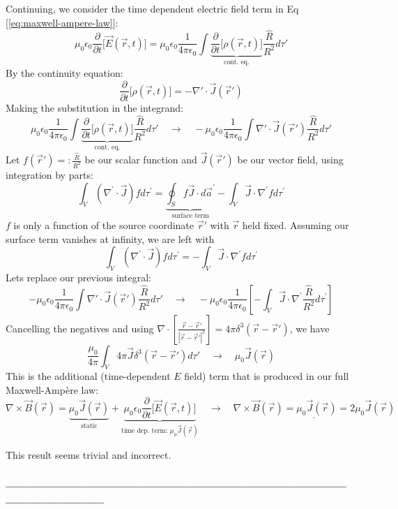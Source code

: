 \documentclass[a4paper,12pt]{article} %
\begin{document}
Continuing, we consider the time dependent electric field term in Eq [\ref{eq:maxwell-ampere-law}]:
$$  \mu_0\epsilon_0 \frac{\partial}{\partial t} \Big[\vec{E}(\vec{r}, t)\Big] = \mu_0\epsilon_0 \frac{1}{4\pi\epsilon_0}\int \underbrace{\frac{\partial}{\partial t}\Big[\rho(\vec{r}, t)\Big]}_{\text{cont. eq.}} \frac{\hat{R}}{{R^2}} d\tau' $$
By the continuity equation:
$$ \frac{\partial}{\partial t}\Big[\rho(\vec{r}, t)\Big] = -\nabla' \cdot \vec{J}(\overrightarrow{r}') $$
Making the substitution in the integrand:
$$ \mu_0\epsilon_0 \frac{1}{4\pi\epsilon_0}\int \underbrace{\frac{\partial}{\partial t}\Big[\rho(\vec{r}, t)\Big]}_{\text{cont. eq.}} \frac{\hat{R}}{{R^2}} d\tau' \quad\rightarrow\quad -\mu_0\epsilon_0 \frac{1}{4\pi\epsilon_0}\int \nabla' \cdot \vec{J}(\overrightarrow{r}') \frac{\hat{R}}{{R^2}} d\tau' $$
Let $ f(\overrightarrow{r}') =: \frac{\hat{R}}{{R^2}} $ be our scalar function and $ \vec{J}(\overrightarrow{r}') $ be our vector field, using integration by parts:
$$\int_V\left(\nabla^{\prime} \cdot \vec{J}\right) f d \tau^{\prime}=\underbrace{\oint_S f \vec{J} \cdot d \overrightarrow{a}^{\prime}}_{\text{surface term}}-\int_V \vec{J} \cdot \nabla^{\prime} f d \tau^{\prime}$$
$f$ is only a function of the source coordinate $\overrightarrow{r}'$ with $\vec{r}$ held fixed.
Assuming our surface term vanishes at infinity, we are left with
$$ \int_V\left(\nabla^{\prime} \cdot \vec{J}\right) f d \tau^{\prime} = -\int_V \vec{J} \cdot \nabla^{\prime} f d \tau^{\prime} $$
Lets replace our previous integral:
$$ -\mu_0\epsilon_0 \frac{1}{4\pi\epsilon_0}\int \nabla' \cdot \vec{J}(\overrightarrow{r}') \frac{\hat{R}}{{R^2}} d\tau' \quad\rightarrow\quad -\mu_0\epsilon_0 \frac{1}{4\pi\epsilon_0} \left[-\int_V \vec{J} \cdot \nabla^{\prime} \frac{\hat{R}}{{R^2}} d \tau^{\prime}\right] $$
Cancelling the negatives and using $\nabla \cdot \left[\frac{\vec{r} - \overrightarrow{r}'}{|\vec{r} - \overrightarrow{r}'|^3}\right] = 4\pi\delta^3(\vec{r} - \overrightarrow{r}')$, we have
$$ \boxed{\frac{\mu_0}{4\pi} \int_{V} 4\pi\vec{J}\delta^3(\vec{r} - \overrightarrow{r}')d\tau' \quad\rightarrow\quad \mu_0\vec{J}(\vec{r})}$$
This is the additional (time-dependent $E$ field) term that is produced in our full Maxwell-Ampère law:
$$ \nabla \times \vec{B}(\vec{r}) = \underbrace{\mu_0\vec{J}(\vec{r})}_{\text{static}} + \underbrace{\mu_0\epsilon_0 \frac{\partial}{\partial t} \Big[\vec{E}(\vec{r}, t)\Big]}_{\text{time dep. term: }\mu_0\vec{J}(\vec{r})} \quad\rightarrow\quad \underline{\boxed{\nabla \times \vec{B}(\vec{r}) = \mu_0\vec{J}(\vec{r}) = 2\mu_0\vec{J}(\vec{r})}} $$

This result seems trivial and incorrect.

\subsubsection*{-----------------------------------------------------------------------------------------------------}
\end{document}
